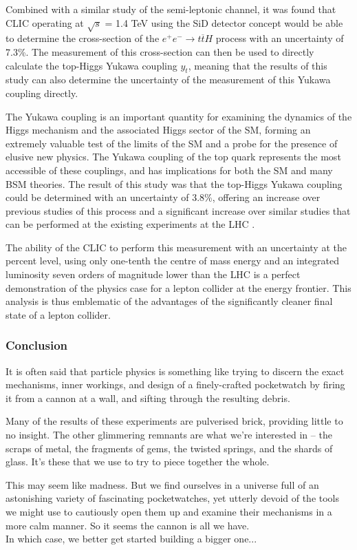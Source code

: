 Combined with a similar study of the semi-leptonic channel, it was found that \acrshort{CLIC} operating at $\sqrt{s}$ = 1.4 TeV using the \acrshort{SiD} detector concept would be able to determine the cross-section of the $e^+ e^- \rightarrow t \overline{t} H$ process with an uncertainty of 7.3\%. The measurement of this cross-section can then be used to directly calculate the top-Higgs Yukawa coupling $y_t$, meaning that the results of this study can also determine the uncertainty of the measurement of this Yukawa coupling directly.

The Yukawa coupling is an important quantity for examining the dynamics of the Higgs mechanism and the associated Higgs sector of the \acrlong{SM}, forming an extremely valuable test of the limits of the \acrshort{SM} and a probe for the presence of elusive new physics. The Yukawa coupling of the top quark represents the most accessible of these couplings, and has implications for both the \acrshort{SM} and many \acrshort{BSM} theories. The result of this study was that the top-Higgs Yukawa coupling could be determined with an uncertainty of 3.8\%, offering an increase over previous studies of this process  and a significant increase over similar studies that can be performed at the existing experiments at the \acrlong{LHC}  .

The ability of the \acrlong{CLIC} to perform this measurement with an uncertainty at the percent level, using only one-tenth the centre of mass energy and an integrated luminosity seven orders of magnitude lower than the \acrshort{LHC} is a perfect demonstration of the physics case for a lepton collider at the energy frontier. This analysis is thus emblematic of the advantages of the significantly cleaner final state of a lepton collider.

\subsubsection*{Conclusion}
It is often said that particle physics is something like trying to discern the exact mechanisms, inner workings, and design of a finely-crafted pocketwatch by firing it from a cannon at a wall, and sifting through the resulting debris.

Many of the results of these experiments are pulverised brick, providing little to no insight. The other glimmering remnants are what we're interested in -- the scraps of metal, the fragments of gems, the twisted springs, and the shards of glass. It's these that we use to try to piece together the whole.

This may seem like madness. But we find ourselves in a universe full of an astonishing variety of fascinating pocketwatches, yet utterly devoid of the tools we might use to cautiously open them up and examine their mechanisms in a more calm manner. So it seems the cannon is all we have. \\

In which case, we better get started building a bigger one...